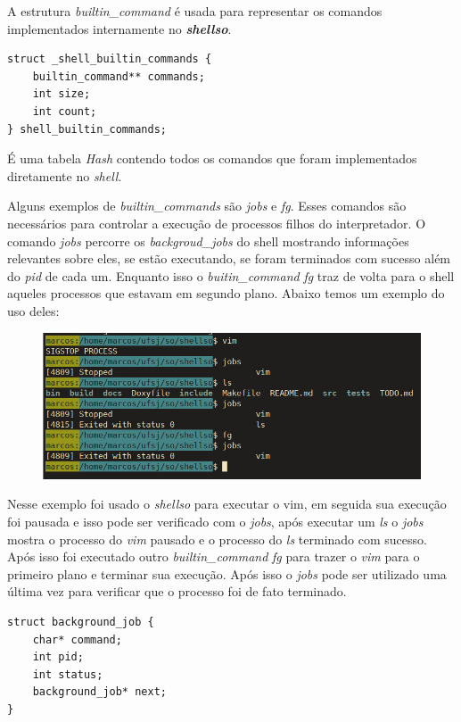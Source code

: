 \documentclass[a4paper, 12pt]{article}
\begin{document}
A estrutura \textit{builtin\_command} é usada para representar os comandos implementados
internamente no \textbf{\textit{shellso}}.

\begin{verbatim}
struct _shell_builtin_commands {
    builtin_command** commands;
    int size;
    int count;
} shell_builtin_commands;
\end{verbatim}

É uma tabela \textit{Hash} contendo todos os comandos que foram implementados diretamente
no \textit{shell}.

Alguns exemplos de \textit{builtin\_commands} são \textit{jobs} e \textit{fg}. Esses comandos
são necessários para controlar a execução de processos filhos do interpretador. O comando 
\textit{jobs} percorre os \textit{backgroud\_jobs} do shell mostrando informações relevantes sobre eles,
se estão executando, se foram terminados com sucesso além do \textit{pid} de cada um. Enquanto isso
o \textit{buitin\_command} \textit{fg} traz de volta para o shell aqueles processos que estavam em segundo
plano. Abaixo temos um exemplo do uso deles:

\begin{figure}[!ht]
	\centering
	\includegraphics[width=12cm]{docs/images/jobs.jpeg}
\end{figure}

Nesse exemplo foi usado o \textit{shellso} para executar o vim,
em seguida sua execução foi pausada e isso pode ser verificado com
o \textit{jobs}, após executar um \textit{ls} o \textit{jobs} mostra
o processo do \textit{vim} pausado e o processo do \textit{ls} terminado com sucesso.
Após isso foi executado outro \textit{builtin\_command} \textit{fg}
para trazer o \textit{vim} para o primeiro plano e terminar sua execução.
Após isso o \textit{jobs} pode ser utilizado uma última vez para verificar que o processo foi de fato terminado.


\begin{verbatim}
struct background_job {
    char* command;
    int pid;
    int status;
    background_job* next;
}
\end{verbatim}
\end{document}
